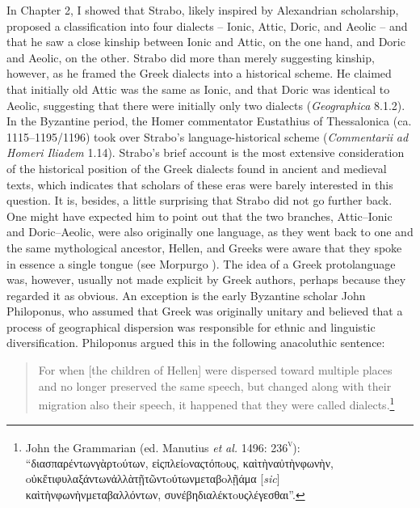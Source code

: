 In Chapter 2, I showed that Strabo, likely inspired by Alexandrian scholarship, proposed a classification into four dialects – Ionic, Attic, Doric, and Aeolic – and that he saw a close kinship between Ionic and Attic, on the one hand, and Doric and Aeolic, on the other. Strabo did more than merely suggesting kinship, however, as he framed the Greek dialects into a historical scheme. He claimed that initially old Attic was the same as Ionic, and that Doric was identical to Aeolic, suggesting that there were initially only two dialects (\textit{Geographica} 8.1.2). In the Byzantine period, the Homer commentator Eustathius of Thessalonica (ca. 1115–1195/1196) took over Strabo’s language-historical scheme (\textit{Commentarii} \textit{ad} \textit{Homeri} \textit{Iliadem} 1.14). Strabo’s brief account is the most extensive consideration of the historical position of the Greek dialects found in ancient and medieval texts, which indicates that scholars of these eras were barely interested in this question. It is, besides, a little surprising that Strabo did not go further back. One might have expected him to point out that the two branches, Attic–Ionic and Doric–Aeolic, were also originally one language, as they went back to one and the same mythological ancestor, Hellen, and Greeks were aware that they spoke in essence a single tongue (see Morpurgo \citealt{Davies1987}). The idea of a Greek protolanguage was, however, usually not made explicit by Greek authors, perhaps because they regarded it as obvious. An exception is the early Byzantine scholar John Philoponus, who assumed that Greek was originally unitary and believed that a process of geographical dispersion was responsible for ethnic and linguistic diversification. Philoponus argued this in the following anacoluthic sentence:

\begin{quote}
For when [the children of Hellen] were dispersed toward multiple places and no longer preserved the same speech, but changed along with their migration also their speech, it happened that they were called dialects.\footnote{John the Grammarian (ed. Manutius \textit{et} \textit{al.} 1496: 236\textsc{\textsuperscript{v}}): “διασπαρέντωνγὰρτoύτων, εἰςπλείoναςτόπoυς, καὶτὴναὐτὴνφωνὴν, oὐκἔτιφυλαξάντων\text{\textgreek{;}}ἀλλὰτῇτῶντoύτωνμεταβoλῇάμα [\textit{sic}] καὶτὴνφωνὴνμεταβαλλόντων, συνέβηδιαλέκτoυςλέγεσθαι”.}
\end{quote}

